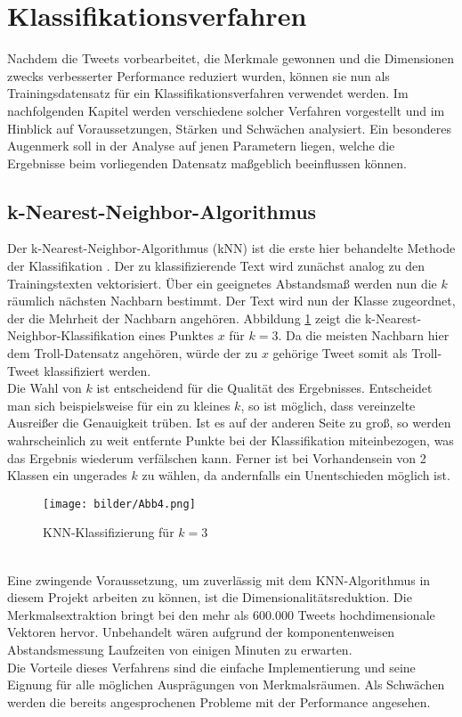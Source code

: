 \section{Klassifikationsverfahren}\label{clf}\raggedbottom
Nachdem die Tweets vorbearbeitet, die Merkmale gewonnen und die Dimensionen zwecks verbesserter Performance reduziert wurden, können sie nun als Trainingsdatensatz für ein Klassifikationsverfahren verwendet werden. Im nachfolgenden Kapitel werden verschiedene solcher Verfahren vorgestellt und im Hinblick auf Voraussetzungen, Stärken und Schwächen analysiert. Ein besonderes Augenmerk soll in der Analyse auf jenen Parametern liegen, welche die Ergebnisse beim vorliegenden Datensatz maßgeblich beeinflussen können.    
\subsection{k-Nearest-Neighbor-Algorithmus}
Der k-Nearest-Neighbor-Algorithmus (kNN) ist die erste hier behandelte Methode der Klassifikation \citep{Guo04}. Der zu klassifizierende Text wird zunächst analog zu den Trainingstexten vektorisiert. Über ein geeignetes Abstandsmaß werden nun die $k$ räumlich nächsten Nachbarn bestimmt. Der Text wird nun der Klasse zugeordnet, der die Mehrheit der Nachbarn angehören. Abbildung \ref{knn-alg} zeigt die k-Nearest-Neighbor-Klassifikation eines Punktes $x$ für $k=3$. Da die meisten Nachbarn hier dem Troll-Datensatz angehören, würde der zu $x$ gehörige Tweet somit als Troll-Tweet klassifiziert werden.\\
Die Wahl von $k$ ist entscheidend für die Qualität des Ergebnisses. Entscheidet man sich beispielsweise für ein zu kleines $k$, so ist möglich, dass vereinzelte Ausreißer die Genauigkeit trüben. Ist es auf der anderen Seite zu groß, so werden wahrscheinlich zu weit entfernte Punkte bei der Klassifikation miteinbezogen, was das Ergebnis wiederum verfälschen kann. Ferner ist bei Vorhandensein von 2 Klassen ein ungerades $k$ zu wählen, da andernfalls ein Unentschieden möglich ist.\\
\begin{figure}[htb]
	\begin{center}
		\texttt{[image: bilder/Abb4.png]}
		\caption{KNN-Klassifizierung für $k=3$}\label{knn-alg}
	\end{center}
\end{figure}\\
Eine zwingende Voraussetzung, um zuverlässig mit dem KNN-Algorithmus in diesem Projekt arbeiten zu können, ist die Dimensionalitätsreduktion. Die Merkmalsextraktion bringt bei den mehr als 600.000 Tweets hochdimensionale Vektoren hervor. Unbehandelt wären aufgrund der komponentenweisen Abstandsmessung Laufzeiten von einigen Minuten zu erwarten.\\
Die Vorteile dieses Verfahrens sind die einfache Implementierung und seine Eignung für alle möglichen Ausprägungen von Merkmalsräumen. Als Schwächen werden die bereits angesprochenen Probleme mit der Performance angesehen.
